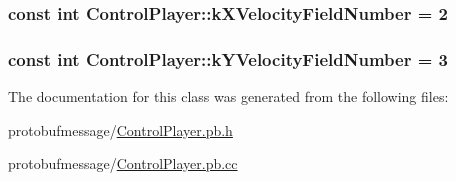 \hypertarget{class_control_player_a2848d79ede088ee9d60163a1ce3debb5}{
\subsubsection[{k\-X\-Velocity\-Field\-Number}]{\setlength{\rightskip}{0pt plus 5cm}const int Control\-Player\-::k\-X\-Velocity\-Field\-Number = 2\hspace{0.3cm}{\ttfamily [static]}}}\label{class_control_player_a2848d79ede088ee9d60163a1ce3debb5}
\hypertarget{class_control_player_a23d77701b2b3c5dcac4c23346e3d8008}{
\subsubsection[{k\-Y\-Velocity\-Field\-Number}]{\setlength{\rightskip}{0pt plus 5cm}const int Control\-Player\-::k\-Y\-Velocity\-Field\-Number = 3\hspace{0.3cm}{\ttfamily [static]}}}\label{class_control_player_a23d77701b2b3c5dcac4c23346e3d8008}


The documentation for this class was generated from the following files\-:\begin{DoxyCompactItemize}
\item 
protobufmessage/\hyperlink{_control_player_8pb_8h}{Control\-Player.\-pb.\-h}\item 
protobufmessage/\hyperlink{_control_player_8pb_8cc}{Control\-Player.\-pb.\-cc}\end{DoxyCompactItemize}
